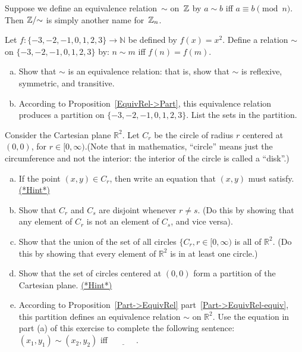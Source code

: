 \begin{eg}
Suppose we define an equivalence relation~$\sim$ on~$\mathbb{Z}$ by $a \sim b$ iff $a \equiv b \pmod{n}$. Then $\mathbb{Z}/\mathord{\sim}$ is simply another name for~$\mathbb{Z}_n$.
\end{eg}

\begin{exercise}\label{exercise:EquivalenceRelationsChap:66}
Let $f\colon \{-3,-2,-1,0,1,2,3\} \to \mathbb{N}$ be defined by $f(x) =  x^2$. Define a relation $\sim$ on $\{-3,-2,-1,0,1,2,3\}$ by: $n \sim m$ iff $f(n) = f(m)$.
\begin{enumerate}[(a)]
\item
Show that $\sim$ is an equivalence relation: that is, show that $\sim$ is reflexive, symmetric, and transitive.
\item
According to Proposition~\ref{EquivRel->Part}, this equivalence relation produces a partition on  $\{-3,-2,-1,0,1,2,3\}$. List the sets in the partition.
\end{enumerate}
\end{exercise}

\begin{exercise}\label{exercise:EquivalenceRelationsChap:67}
Consider the Cartesian plane $\mathbb{R}^2$. Let $C_r$ be the circle of radius $r$ centered at $(0,0)$, for $r \in [0,\infty)$.(Note that in mathematics, ``circle'' means just the circumference and not the interior: the interior of the circle is called a ``disk''.)
\begin{enumerate}[(a)]
\item
If the point $(x,y) \in C_r$, then write an equation that $(x,y)$ must satisfy.
\hyperref[sec:EquivalenceRelationsChap:hints]{(*Hint*)}
\item
Show that $C_{r}$ and $C_{s}$ are disjoint whenever $r \neq s$. (Do this by showing that any element of $C_{r}$ is not an element of $C_{s}$, and vice versa).
\item
Show that the union of the set of all circles $\{C_r, r \in [0,\infty)$ is all of $\mathbb{R}^2$. (Do this by showing that every element of $\mathbb{R}^2$ is in at least one circle.)
\item
Show that the set of circles centered at $(0,0)$ form a partition of the Cartesian plane.
\hyperref[sec:EquivalenceRelationsChap:hints]{(*Hint*)}
\item
According to Proposition~\ref{Part->EquivRel} part~\ref{Part->EquivRel-equiv}, this partition  defines an equivalence relation $\sim$ on $\mathbb{R}^2$. Use the equation in part (a) of this exercise to complete the following sentence:  $(x_1,y_1) \sim (x_2,y_2)$ iff $\underline{~~~~~~~~~~~~~~}$.
\end{enumerate}
\end{exercise}



